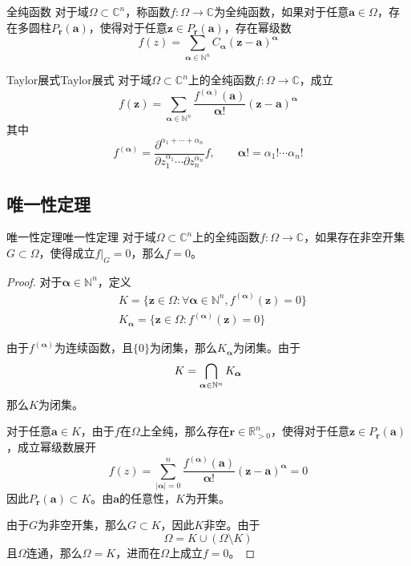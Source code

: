 \documentclass[lang = cn, scheme = chinese, thmcnt = section]{elegantbook}
\newcommand{\N}{\mathbb{N}}            %
\newcommand{\R}{\mathbb{R}}            %
\newcommand{\C}{\mathbb{C}}  		   %
\newcommand{\sub}{\subset}             %
\newcommand{\bs}{\boldsymbol}          %
\begin{document}
\begin{definition}{全纯函数}
	对于域$\Omega\sub\C^n$，称函数$f:\Omega\to\C$为全纯函数，如果对于任意$\bs{a}\in\Omega$，存在多圆柱$P_{\bs{r}}(\bs{a})$，使得对于任意$\bs{z}\in P_{\bs{r}}(\bs{a})$，存在幂级数
	$$
	f(z)=\sum_{\bs{\alpha}\in\N^n}C_{\bs{\alpha}}(\bs{z}-\bs{a})^{\bs{\alpha}}
	$$
\end{definition}

\begin{theorem}{Taylor展式}{Taylor展式}
	对于域$\Omega\sub\C^n$上的全纯函数$f:\Omega\to\C$，成立
	$$
	f(\bs{z})
	=\sum_{\bs{\alpha}\in\N^n}\frac{f^{(\bs{\alpha})}(\bs{a})}{\bs{\alpha}!}(\bs{z}-\bs{a})^{\bs{\alpha}}
	$$
	其中
	$$
	f^{(\bs{\alpha})}=\frac{\partial^{\alpha_1+\cdots+\alpha_n}}{\partial z_1^{\alpha_1}\cdots \partial z_n^{\alpha_n}}f,\qquad 
	\bs{\alpha}!=\alpha_1!\cdots\alpha_n!
	$$
\end{theorem}

\subsection{唯一性定理}

\begin{theorem}{唯一性定理}{唯一性定理}
	对于域$\Omega\sub\C^n$上的全纯函数$f:\Omega\to\C$，如果存在非空开集$G\sub\Omega$，使得成立$f|_G=0$，那么$f=0$。
\end{theorem}

\begin{proof}
	对于$\bs{\alpha}\in\N^n$，定义
	\begin{align*}
		& K = \{ \bs{z}\in \Omega:\forall\bs{\alpha}\in\N^n,f^{(\bs{\alpha})}(\bs{z})=0 \}\\
		& K_{\bs{\alpha}} = \{ \bs{z}\in \Omega:f^{(\bs{\alpha})}(\bs{z})=0 \}
	\end{align*}
	
	由于$f^{(\bs{\alpha})}$为连续函数，且$\{0\}$为闭集，那么$K_{\bs{\alpha}}$为闭集。由于
	$$
	K=\bigcap_{\bs{\alpha}\in\N^n}K_{\bs{\alpha}}\\
	$$
	那么$K$为闭集。
	
	对于任意$\bs{a}\in K$，由于$f$在$\Omega$上全纯，那么存在$\bs{r}\in\R_{>0}^n$，使得对于任意$\bs{z}\in P_{\bs{r}}(\bs{a})$，成立幂级数展开
	$$
	f(z)
	=\sum_{|\bs{\alpha}|=0}^{n}\frac{f^{(\bs{\alpha})}(\bs{a})}{\bs{\alpha}!}(\bs{z}-\bs{a})^{\bs{\alpha}}=0
	$$
	因此$P_{\bs{r}}(\bs{a})\sub K$。由$\bs{a}$的任意性，$K$为开集。
	
	由于$G$为非空开集，那么$G\sub K$，因此$K$非空。由于
	$$
	\Omega=K\cup (\Omega\setminus K)
	$$
	且$\Omega$连通，那么$\Omega=K$，进而在$\Omega$上成立$f=0$。
\end{proof}
\end{document}
